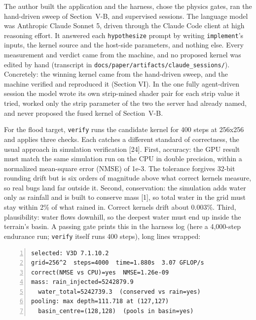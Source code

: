\documentclass[conference]{IEEEtran}
\begin{document}
The author built the application and the harness, chose the physics
gates, ran the hand-driven sweep of \mbox{Section V-B}, and supervised
sessions. The language model was Anthropic Claude Sonnet 5, driven
through the Claude Code client at high reasoning effort. It answered
each \texttt{hypothesize} prompt by writing \texttt{implement}'s inputs,
the kernel source and the host-side parameters, and nothing else. Every
measurement and verdict came from the machine, and no proposed kernel
was edited by hand (transcript in
\texttt{docs/paper/artifacts/claude\_sessions/}). Concretely: the
winning kernel came from the hand-driven sweep, and the machine verified
and reproduced it (Section VI). In the one fully agent-driven session
the model wrote its own strip-mined shader pair for each strip value it
tried, worked only the strip parameter of the two the server had already
named, and never proposed the fused kernel of \mbox{Section V-B}.

For the flood target, \texttt{verify} runs the candidate kernel for 400
steps at 256x256 and applies three checks. Each catches a different
standard of correctness, the usual approach in simulation verification
{[}24{]}. First, accuracy: the GPU result must match the same simulation
run on the CPU in double precision, within a normalized mean-square
error (NMSE) of 1e-3. The tolerance forgives 32-bit rounding drift but
is six orders of magnitude above what correct kernels measure, so real
bugs land far outside it. Second, conservation: the simulation adds
water only as rainfall and is built to conserve mass {[}1{]}, so total
water in the grid must stay within 2\% of what rained in. Correct
kernels drift about 0.003\%. Third, plausibility: water flows downhill,
so the deepest water must end up inside the terrain's basin. A passing
gate prints this in the harness log (here a 4,000-step endurance run;
\texttt{verify} itself runs 400 steps), long lines wrapped:

\medskip\noindent\begin{minipage}{\linewidth}
\begin{Verbatim}[frame=single,numbers=left,numbersep=3pt,framesep=1.6mm,fontsize=\scriptsize]
selected: V3D 7.1.10.2
grid=256^2  steps=4000  time=1.880s  3.07 GFLOP/s
correct(NMSE vs CPU)=yes  NMSE=1.26e-09
mass: rain_injected=5242879.9
  water_total=5242739.3  (conserved vs rain=yes)
pooling: max depth=111.718 at (127,127)
  basin_centre=(128,128)  (pools in basin=yes)
\end{Verbatim}
\end{minipage}\medskip
\end{document}
